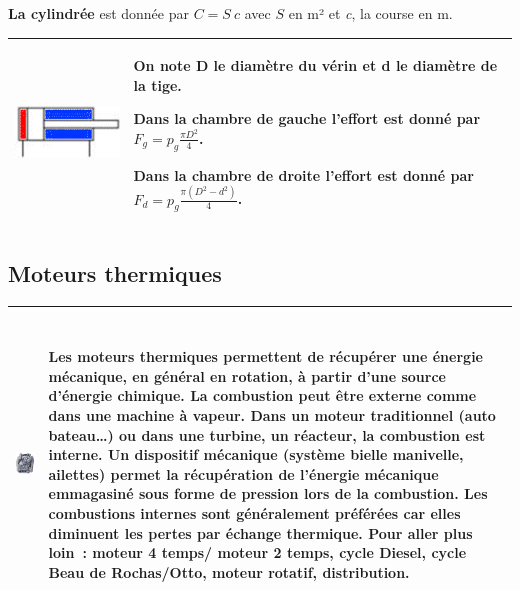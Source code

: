 \textbf{La cylindrée} est donnée par \(C = S\ c\) avec \(S\) en m² et
\emph{c}, la course en m.

\begin{longtable}[]{@{}
  >{\raggedright\arraybackslash}p{}
  >{\raggedright\arraybackslash}p{}@{}}
\toprule
\endhead
\includegraphics[width=1.42708in,height=0.71875in]{media/image83.png} &
On note D le diamètre du vérin et d le diamètre de la tige.

Dans la chambre de gauche l'effort est donné par
\(F_{g} = p_{g}\frac{\pi D^{2}}{4}\).

Dans la chambre de droite l'effort est donné par
\(F_{d} = p_{g}\frac{\pi\left( D^{2} - d^{2} \right)}{4}\). \\
\bottomrule
\end{longtable}

\hypertarget{moteurs-thermiques}{%
\subsection{Moteurs thermiques}\label{moteurs-thermiques}}

\begin{longtable}[]{@{}ll@{}}
\toprule
\endhead
\includegraphics[width=2.79532in,height=3.1643in]{media/image84.jpeg} &
Les moteurs thermiques permettent de récupérer une énergie mécanique, en
général en rotation, à partir d'une source d'énergie chimique. La
combustion peut être externe comme dans une machine à vapeur. Dans un
moteur traditionnel (auto bateau\ldots) ou dans une turbine, un
réacteur, la combustion est interne. Un dispositif mécanique (système
bielle manivelle, ailettes) permet la récupération de l'énergie
mécanique emmagasiné sous forme de pression lors de la combustion. Les
combustions internes sont généralement préférées car elles diminuent les
pertes par échange thermique. Pour aller plus loin~: moteur 4 temps/
moteur 2 temps, cycle Diesel, cycle Beau de Rochas/Otto, moteur rotatif,
distribution. \\
\bottomrule
\end{longtable}